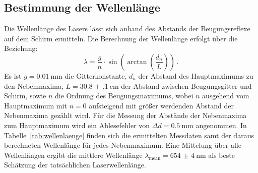 \subsection{Bestimmung der Wellenlänge}

Die Wellenlänge des Lasers lässt sich anhand des Abstands der Beugungsreflexe auf dem Schirm ermitteln.
Die Berechnung der Wellenlänge erfolgt über die Beziehung:
\begin{equation}
  \lambda=\frac{g}{n}\cdot\sin\left(\arctan\left(\frac{d_n}{L}\right)\right)\,\text{.}
\end{equation}
Es ist $g=\SI{0.01}{\milli\meter}$ die Gitterkonstante, $d_n$ der Abstand des Hauptmaximums zu den Nebenmaxima, $L=\SI{30.8(1)}{\centi\meter}$ der Abstand zwischen Beugungsgitter und Schirm, sowie $n$ die Ordnung des Beugungsmaximums, wobei $n$ ausgehend vom Hauptmaximum mit $n=0$ aufsteigend mit größer werdenden Abstand der Nebenmaxima gezählt wird.
Für die Messung der Abstände der Nebenmaxima zum Hauptmaximum wird ein Ablesefehler von $\Delta d=\SI{0.5}{\milli\meter}$ angenommen.
In Tabelle~\ref{tab:wellenlaenge} finden sich die ermittelten Messdaten samt der daraus berechneten Wellenlänge für jedes Nebenmaximum.
Eine Mittelung über alle Wellenlängen ergibt die mittlere Wellenlänge
$\lambda_{\mathrm{mean}}=\SI{654(4)}{\nano\meter}$
als beste Schätzung der tatsächlichen Laserwellenlänge.
